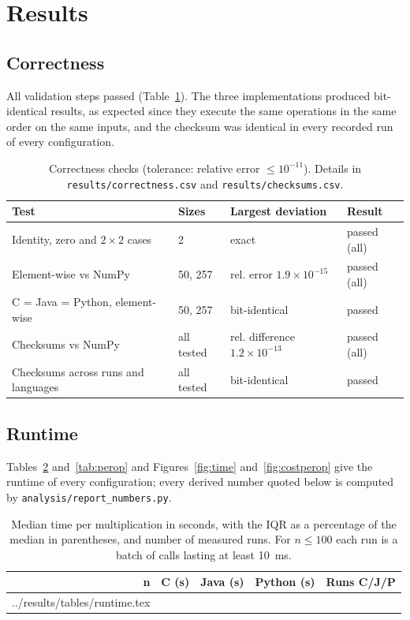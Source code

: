 \documentclass[12pt,a4paper]{article}
\makeatletter
\newcommand{\tableinput}[1]{\@@input #1 }
\makeatother
\begin{document}
\section{Results}

\subsection{Correctness}

All validation steps passed (Table~\ref{tab:correctness}). The three implementations
produced bit-identical results, as expected since they execute the same operations in
the same order on the same inputs, and the checksum was identical in every recorded run
of every configuration.

\begin{table}[htbp]
\centering
\small
\begin{tabular}{llll}
\toprule
\textbf{Test} & \textbf{Sizes} & \textbf{Largest deviation} & \textbf{Result} \\
\midrule
Identity, zero and $2 \times 2$ cases & 2 & exact & passed (all) \\
Element-wise vs NumPy & 50, 257 & rel. error $1.9 \times 10^{-15}$ & passed (all) \\
C = Java = Python, element-wise & 50, 257 & bit-identical & passed \\
Checksums vs NumPy & all tested & rel. difference $1.2 \times 10^{-13}$ & passed (all) \\
Checksums across runs and languages & all tested & bit-identical & passed \\
\bottomrule
\end{tabular}
\caption{Correctness checks (tolerance: relative error $\le 10^{-11}$). Details in
\texttt{results/correctness.csv} and \texttt{results/checksums.csv}.}
\label{tab:correctness}
\end{table}

\subsection{Runtime}

Tables~\ref{tab:runtime} and~\ref{tab:perop} and Figures~\ref{fig:time}
and~\ref{fig:costperop} give the runtime of every configuration; every derived number
quoted below is computed by \texttt{analysis/report\_numbers.py}.

\begin{table}[htbp]
\centering
\small
\begin{tabular}{rllll}
\toprule
\textbf{n} & \textbf{C (s)} & \textbf{Java (s)} & \textbf{Python (s)} &
\textbf{Runs C/J/P} \\
\midrule
\tableinput{../results/tables/runtime.tex}
\bottomrule
\end{tabular}
\caption{Median time per multiplication in seconds, with the IQR as a percentage of the
median in parentheses, and number of measured runs. For $n \le 100$ each run is a batch
of calls lasting at least 10~ms.}
\label{tab:runtime}
\end{table}
\end{document}
